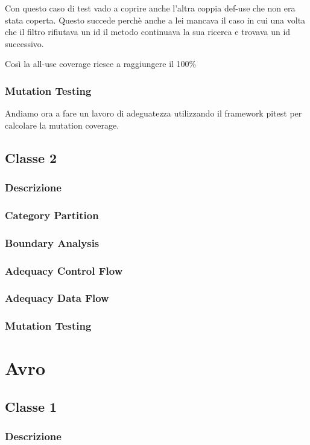\documentclass[12pt, a4paper]{article}
\begin{document}
Con questo caso di test vado a coprire anche l'altra coppia def-use che non era stata coperta.
Questo succede perchè anche a lei mancava il caso in cui una volta che il filtro rifiutava un id il
metodo continuava la sua ricerca e trovava un id successivo.

Così la all-use coverage riesce a raggiungere il 100\%

\subsubsection{Mutation Testing}
Andiamo ora a fare un lavoro di adeguatezza utilizzando il framework pitest per calcolare la mutation coverage. \\



\subsection{Classe 2}
\subsubsection{Descrizione}
\subsubsection{Category Partition}
\subsubsection{Boundary Analysis}
\subsubsection{Adequacy Control Flow}
\subsubsection{Adequacy Data Flow}
\subsubsection{Mutation Testing}

\section{Avro}
\subsection{Classe 1}
\subsubsection{Descrizione}
\end{document}
